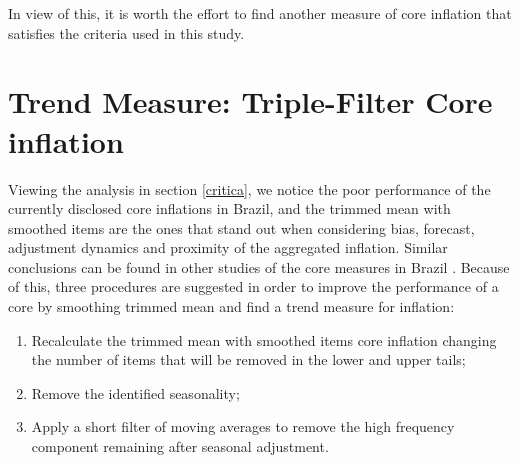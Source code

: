 \documentclass[10pt]{article}
\begin{document}
In view of this, it is worth the effort to find another measure of core inflation that satisfies the criteria used in this study.


\section{Trend Measure: Triple-Filter Core inflation}\label{metodologia}

Viewing the analysis in section \ref{critica}, we notice the poor performance of the currently disclosed core inflations in Brazil, and the trimmed mean with smoothed items are the ones that stand out when considering bias, forecast, adjustment dynamics and proximity of the aggregated inflation. Similar conclusions can be found in other studies of the core measures in Brazil \citep{tito2011,castelar2013,tito2014}. Because of this, three procedures are suggested in order to improve the performance of a core by smoothing trimmed mean and find a trend measure for inflation:


\begin{enumerate}
 \setlength\itemsep{0.1em}
\item Recalculate the trimmed mean with smoothed items core inflation changing the number of items that will be removed in the lower and upper tails;
\item  Remove the identified seasonality;
\item Apply a short filter of moving averages to remove the high frequency component remaining after seasonal adjustment.
\end{enumerate}
\end{document}
